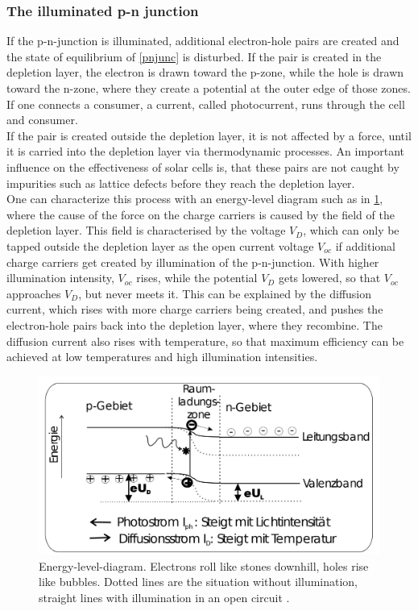 \documentclass[english,  %
parskip=full,  %
headsepline]{scrartcl}
\begin{document}
\subsubsection{The illuminated p-n junction}
If the p-n-junction is illuminated, additional electron-hole pairs are created and the state of equilibrium of \cref{pnjunc} is disturbed. If the pair is created in the depletion layer, the electron is drawn toward the p-zone, while the hole is drawn toward the n-zone, where they create a potential at the outer edge of those zones. If one connects a consumer, a current, called photocurrent, runs through the cell and consumer. \\
If the pair is created outside the depletion layer, it is not affected by a force, until it is carried into the depletion layer via thermodynamic processes. An important influence on the effectiveness of solar cells is, that these pairs are not caught by impurities such as lattice defects before they reach the depletion layer.\\
One can characterize this process with an energy-level diagram such as in \cref{fig:energylevel}, where the cause of the force on the charge carriers is caused by the field of the depletion layer. This field is characterised by the voltage $V_D$, which can only be tapped outside the depletion layer as the open current voltage $V_{oc}$ if additional charge carriers get created by illumination of the p-n-junction. With higher illumination intensity, $V_{oc}$ rises, while the potential $V_D$ gets lowered, so that $V_{oc}$ approaches $V_D$, but never meets it. This can be explained by the diffusion current, which rises with more charge carriers being created, and pushes the electron-hole pairs back into the depletion layer, where they recombine. The diffusion current also rises with temperature, so that maximum efficiency can be achieved at low temperatures and high illumination intensities.
\begin{figure}[H]
    \centering
    \includegraphics[width=0.8\linewidth]{energieschema.jpg}
    \caption{Energy-level-diagram. Electrons roll like stones downhill, holes rise like bubbles. Dotted lines are the situation without illumination, straight lines with illumination in an open circuit \cite{instructions}.}
    \label{fig:energylevel}
\end{figure}
\end{document}
